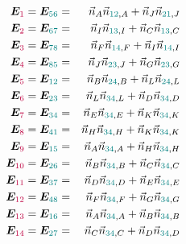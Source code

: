 \begin{enumerate}
\begin{eqnarray}
{\bm E}_{\color{purple}1} ={\bm E}_{\color{teal}56}
&=&\vec{n}_A \vec{n}_{{\color{teal}12},A} 
+  \vec{n}_J \vec{n}_{{\color{teal}21},J} \nn\\
{\bm E}_{\color{purple}2} ={\bm E}_{\color{teal}67}
&=&\vec{n}_I \vec{n}_{{\color{teal}13},I} 
+  \vec{n}_C \vec{n}_{{\color{teal}13},C} \nn\\
{\bm E}_{\color{purple}3} ={\bm E}_{\color{teal}78}
&=&\vec{n}_F \vec{n}_{{\color{teal}14},F}
+  \vec{n}_I \vec{n}_{{\color{teal}14},I} \nn\\
{\bm E}_{\color{purple}4} ={\bm E}_{\color{teal}85}
&=&\vec{n}_J \vec{n}_{{\color{teal}23},J}
+  \vec{n}_G \vec{n}_{{\color{teal}23},G} \nn\\
{\bm E}_{\color{purple}5} ={\bm E}_{\color{teal}12}
&=&\vec{n}_B \vec{n}_{{\color{teal}24},B} 
+  \vec{n}_L \vec{n}_{{\color{teal}24},L} \nn\\  
{\bm E}_{\color{purple}6} ={\bm E}_{\color{teal}23}
&=&\vec{n}_L \vec{n}_{{\color{teal}34},L} 
+  \vec{n}_D \vec{n}_{{\color{teal}34},D} \nn\\
{\bm E}_{\color{purple}7} ={\bm E}_{\color{teal}34}  
&=&\vec{n}_E \vec{n}_{{\color{teal}34},E} 
+  \vec{n}_K \vec{n}_{{\color{teal}34},K} \nn\\
{\bm E}_{\color{purple}8} ={\bm E}_{\color{teal}41}  
&=&\vec{n}_H \vec{n}_{{\color{teal}34},H} 
+  \vec{n}_K \vec{n}_{{\color{teal}34},K} \nn\\
{\bm E}_{\color{purple}9} ={\bm E}_{\color{teal}15}  
&=&\vec{n}_A \vec{n}_{{\color{teal}34},A} 
+  \vec{n}_H \vec{n}_{{\color{teal}34},H} \nn\\
{\bm E}_{\color{purple}10} ={\bm E}_{\color{teal}26} 
&=&\vec{n}_B \vec{n}_{{\color{teal}34},B} 
+  \vec{n}_C \vec{n}_{{\color{teal}34},C} \nn\\
{\bm E}_{\color{purple}11} ={\bm E}_{\color{teal}37} 
&=&\vec{n}_D \vec{n}_{{\color{teal}34},D} 
+  \vec{n}_E \vec{n}_{{\color{teal}34},E} \nn\\
{\bm E}_{\color{purple}12} ={\bm E}_{\color{teal}48} 
&=&\vec{n}_F \vec{n}_{{\color{teal}34},F} 
+  \vec{n}_G \vec{n}_{{\color{teal}34},G} \nn\\
{\bm E}_{\color{purple}13} ={\bm E}_{\color{teal}16}   
&=&\vec{n}_A \vec{n}_{{\color{teal}34},A} 
+  \vec{n}_B \vec{n}_{{\color{teal}34},B} \nn\\
{\bm E}_{\color{purple}14} ={\bm E}_{\color{teal}27}   
&=&\vec{n}_C \vec{n}_{{\color{teal}34},C} 
+  \vec{n}_D \vec{n}_{{\color{teal}34},D} \nn\\

\end{eqnarray}
\end{enumerate}
